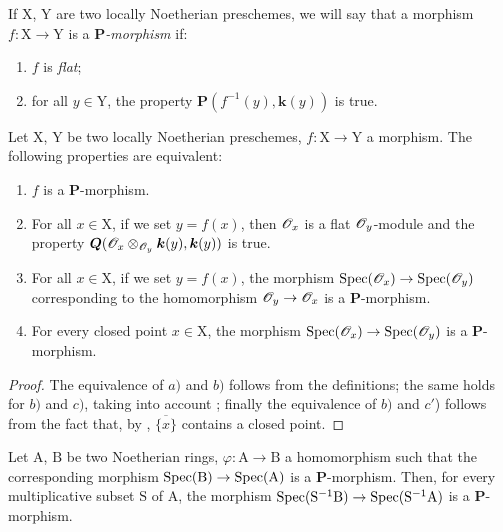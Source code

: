 
If $\mathrm{X}$, $\mathrm{Y}$ are two locally Noetherian preschemes, we will say that a morphism $f:\mathrm{X}\to\mathrm{Y}$ is a \emph{$\boldsymbol{P}$-morphism} if:
\begin{enumerate}[label=\arabic{enumi}\textsuperscript{o}]
  \item $f$ is \emph{flat};
  \item for all $y\in\mathrm{Y}$, the property $\boldsymbol{P}(f^{-1}(y),\boldsymbol{k}(y))$ is true.
\end{enumerate}

\begin{lemma}[7.3.2]
\label{IV.7.3.2}
Let $\mathrm{X}$, $\mathrm{Y}$ be two locally Noetherian preschemes, $f:\mathrm{X}\to\mathrm{Y}$ a morphism.
The following properties are equivalent:
\begin{enumerate}[label=\emph{\alph*)}]
  \item $f$ is a $\boldsymbol{P}$-morphism.
  \item For all $x\in\mathrm{X}$, if we set $y=f(x)$, then $\mathscr{O}_x$ is a flat $\mathscr{O}_y$-module and the property $\boldsymbol{Q}(\mathscr{O}_x\otimes_{\mathscr{O}_y}\boldsymbol{k}(y),\boldsymbol{k}(y))$ is true.
  \item For all $x\in\mathrm{X}$, if we set $y=f(x)$, the morphism $\operatorname{Spec}(\mathscr{O}_x)\to\operatorname{Spec}(\mathscr{O}_y)$ corresponding to the homomorphism $\mathscr{O}_y\to\mathscr{O}_x$ is a $\boldsymbol{P}$-morphism.
  \item[\emph{c$'$)}] For every closed point $x\in\mathrm{X}$, the morphism $\operatorname{Spec}(\mathscr{O}_x)\to\operatorname{Spec}(\mathscr{O}_y)$ is a $\boldsymbol{P}$-morphism.
\end{enumerate}
\end{lemma}

\begin{proof}
The equivalence of $a)$ and $b)$ follows from the definitions; the same holds for $b)$ and $c)$, taking into account ; finally the equivalence of $b)$ and $c'$) follows from the fact that, by , $\overline{\{x\}}$ contains a closed point.
\end{proof}

\begin{corollary}[7.3.3]
\label{IV.7.3.3}
Let $\mathrm{A}$, $\mathrm{B}$ be two Noetherian rings, $\varphi:\mathrm{A}\to\mathrm{B}$ a homomorphism such that the corresponding morphism $\operatorname{Spec}(\mathrm{B})\to\operatorname{Spec}(\mathrm{A})$ is a $\boldsymbol{P}$-morphism.
Then, for every multiplicative subset $\mathrm{S}$ of $\mathrm{A}$, the morphism $\operatorname{Spec}(\mathrm{S}^{-1}\mathrm{B})\to\operatorname{Spec}(\mathrm{S}^{-1}\mathrm{A})$ is a $\boldsymbol{P}$-morphism.
\end{corollary}


